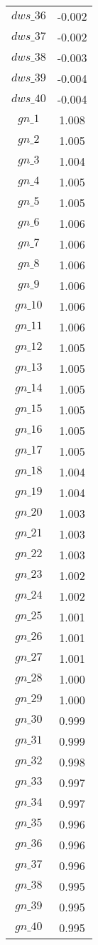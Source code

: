 \begin{center}
\begin{longtable}{cc}
$dws\_36$ 	 & 	 -0.002 \\
$dws\_37$ 	 & 	 -0.002 \\
$dws\_38$ 	 & 	 -0.003 \\
$dws\_39$ 	 & 	 -0.004 \\
$dws\_40$ 	 & 	 -0.004 \\
$gn\_1$ 	 & 	 1.008 \\
$gn\_2$ 	 & 	 1.005 \\
$gn\_3$ 	 & 	 1.004 \\
$gn\_4$ 	 & 	 1.005 \\
$gn\_5$ 	 & 	 1.005 \\
$gn\_6$ 	 & 	 1.006 \\
$gn\_7$ 	 & 	 1.006 \\
$gn\_8$ 	 & 	 1.006 \\
$gn\_9$ 	 & 	 1.006 \\
$gn\_10$ 	 & 	 1.006 \\
$gn\_11$ 	 & 	 1.006 \\
$gn\_12$ 	 & 	 1.005 \\
$gn\_13$ 	 & 	 1.005 \\
$gn\_14$ 	 & 	 1.005 \\
$gn\_15$ 	 & 	 1.005 \\
$gn\_16$ 	 & 	 1.005 \\
$gn\_17$ 	 & 	 1.005 \\
$gn\_18$ 	 & 	 1.004 \\
$gn\_19$ 	 & 	 1.004 \\
$gn\_20$ 	 & 	 1.003 \\
$gn\_21$ 	 & 	 1.003 \\
$gn\_22$ 	 & 	 1.003 \\
$gn\_23$ 	 & 	 1.002 \\
$gn\_24$ 	 & 	 1.002 \\
$gn\_25$ 	 & 	 1.001 \\
$gn\_26$ 	 & 	 1.001 \\
$gn\_27$ 	 & 	 1.001 \\
$gn\_28$ 	 & 	 1.000 \\
$gn\_29$ 	 & 	 1.000 \\
$gn\_30$ 	 & 	 0.999 \\
$gn\_31$ 	 & 	 0.999 \\
$gn\_32$ 	 & 	 0.998 \\
$gn\_33$ 	 & 	 0.997 \\
$gn\_34$ 	 & 	 0.997 \\
$gn\_35$ 	 & 	 0.996 \\
$gn\_36$ 	 & 	 0.996 \\
$gn\_37$ 	 & 	 0.996 \\
$gn\_38$ 	 & 	 0.995 \\
$gn\_39$ 	 & 	 0.995 \\
$gn\_40$ 	 & 	 0.995 \\
\bottomrule%
\end{longtable}
\end{center}
